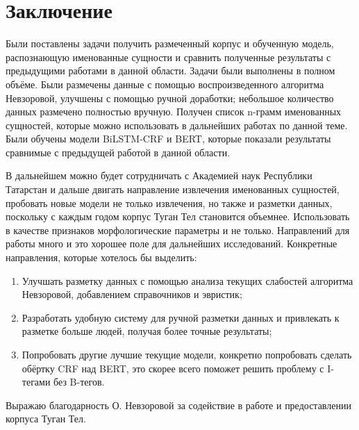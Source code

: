 \section{Заключение}

Были поставлены задачи получить размеченный корпус и обученную модель, распознающую именованные сущности и сравнить полученные результаты с предыдущими работами в данной области. Задачи были выполнены в полном объёме. Были размечены данные с помощью воспроизведенного алгоритма Невзоровой, улучшены с помощью ручной доработки; небольшое количество данных размечено полностью вручную. Получен список n-грамм именованных сущностей, которые можно использовать в дальнейших работах по данной теме. Были обучены модели BiLSTM-CRF и BERT, которые показали результаты сравнимые с предыдущей работой в данной области. 

В дальнейшем можно будет сотрудничать с Академией наук Республики Татарстан и дальше двигать направление извлечения именованных сущностей, пробовать новые модели не только извлечения, но также и разметки данных, поскольку с каждым годом корпус Туган Тел становится объемнее. Использовать в качестве признаков морфологические параметры и не только. Направлений для работы много и это хорошее поле для дальнейших исследований. Конкретные направления, которые хотелось бы выделить:

\begin{enumerate}
\item Улучшать разметку данных с помощью анализа текущих слабостей алгоритма Невзоровой, добавлением справочников и эвристик; 
\item Разработать удобную систему для ручной разметки данных и привлекать к разметке больше людей, получая более точные результаты;
\item Попробовать другие лучшие текущие модели, конкретно попробовать сделать обёртку CRF над BERT, это скорее всего поможет решить проблему с I-тегами без B-тегов.
\end{enumerate}

Выражаю благодарность О. Невзоровой за содействие в работе и предоставлении корпуса Туган Тел.